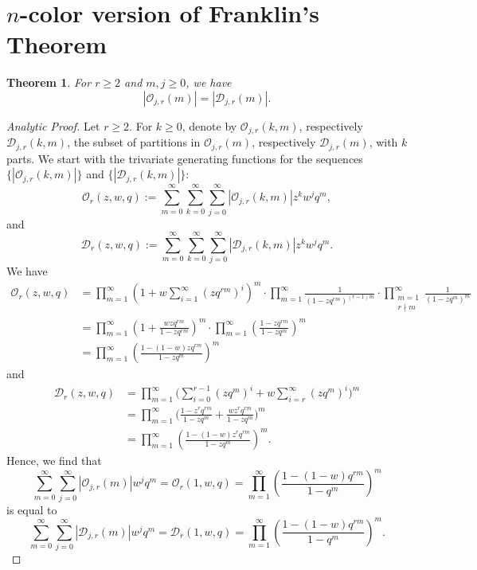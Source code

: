 \documentclass[reqno,12pt]{amsart}
\newtheorem{theorem}{Theorem}[section]
\theoremstyle{definition}
\begin{document}
\section{$n$-color version of Franklin's Theorem}

\begin{theorem} \label{F} For $r\geq2$ and $m,j\geq 0$, we have
\begin{equation}\label{FTid}
|\mathcal{O}_{j,r}(m)|=|\mathcal{D}_{j,r}(m)|.
\end{equation} 
\end{theorem}

\begin{proof}[Analytic Proof] Let $r\geq 2$. For $k\geq 0$, denote by $\mathcal{O}_{j,r}(k,m)$, respectively $\mathcal{D}_{j,r}(k,m)$,  the subset of partitions in $\mathcal{O}_{j,r}(m)$, respectively $\mathcal{D}_{j,r}(m)$, with $k$ parts. We start with the trivariate generating functions for the sequences $\{|\mathcal{O}_{j,r}(k,m)|\}$ and $\{|\mathcal{D}_{j,r}(k,m)|\}$: 
$$\mathcal{O}_r(z,w,q):=
\sum_{m=0}^\infty\sum_{k=0}^\infty\sum_{j=0}^\infty|\mathcal{O}_{j,r}(k,m)|z^kw^jq^m,$$ 
and 
$$\mathcal{D}_r(z,w,q):=\sum_{m=0}^\infty\sum_{k=0}^\infty\sum_{j=0}^\infty|\mathcal{D}_{j,r}(k,m)|z^kw^jq^m.$$ 
We have  
\begin{align*}
\mathcal{O}_r(z,w,q)
&=\prod_{m=1}^\infty(1+w\sum_{i=1}^{\infty}(zq^{rm})^i)^m\cdot
\prod_{m=1}^\infty\frac{1}{(1-zq^{rm})^{(r-1)m}}\cdot\prod_{\substack{m=1\\ r\nmid m}}^\infty\frac{1}{(1-zq^m)^m}   \\  
&=\prod_{m=1}^\infty\left(1+\frac{wzq^{rm}}{1-zq^{rm}}\right)^m\cdot \prod_{m=1}^\infty\left(\frac{1-zq^{rm}}{1-zq^m}\right)^m\\
&=\prod_{m=1}^{\infty}\left(\frac{1-(1-w)zq^{rm}}{1-zq^{m}}\right)^m
\end{align*} 
and  
\begin{align*}
\mathcal{D}_r(z,w,q)
&=\prod_{m=1}^\infty\Big(\sum_{i=0}^{r-1}(zq^{m})^i+w\sum_{i=r}^{\infty}(zq^{m})^i\Big)^m\\
&=\prod_{m=1}^\infty\Big(\frac{1-z^rq^{rm}}{1-zq^m}+\frac{wz^rq^{rm}}{1-zq^m}\Big)^m\\
&=\prod_{m=1}^{\infty}\left(\frac{1-(1-w)z^rq^{rm}}{1-zq^{m}}\right)^m.
\end{align*} 
Hence, we find that
$$\sum_{m=0}^\infty\sum_{j=0}^\infty|\mathcal{O}_{j,r}(m)|w^jq^m
=\mathcal{O}_r(1,w,q)=\prod_{m=1}^{\infty}\left(\frac{1-(1-w)q^{rm}}{1-q^{m}}\right)^m$$
is equal to
$$\sum_{m=0}^\infty\sum_{j=0}^\infty|\mathcal{D}_{j,r}(m)|w^jq^m
=\mathcal{D}_r(1,w,q)
=\prod_{m=1}^{\infty}\left(\frac{1-(1-w)q^{rm}}{1-q^{m}}\right)^m.$$
\end{proof}
\end{document}
